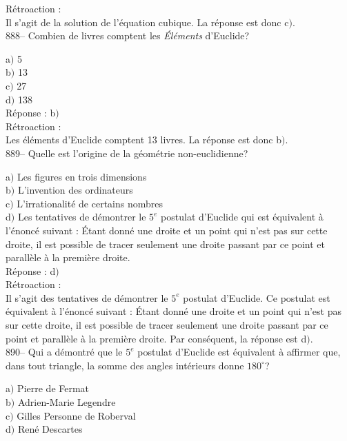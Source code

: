 ﻿\documentclass[letterpaper, 12pt]{article}
\begin{document}
R\'etroaction :\\
Il s'agit de la solution de l'\'equation cubique. La r\'eponse est donc
c$)$.\\

888-- Combien de livres comptent les {\sl \'El\'ements} d'Euclide?

a$)$ 5 \\
b$)$ 13  \\
c$)$ 27 \\
d$)$ 138 \\

R\'eponse : b$)$\\

R\'etroaction : \\
Les \'el\'ements d'Euclide comptent 13 livres. La r\'eponse est donc b$)$.\\

889-- Quelle est l'origine de la g\'eom\'etrie non-euclidienne?

a$)$ Les figures en trois dimensions \\
b$)$ L'invention des ordinateurs  \\
c$)$ L'irrationalit\'e de certains nombres \\
d$)$ Les tentatives de d\'emontrer le $5^e$ postulat d'Euclide qui
est \'equivalent \`a l'\'enonc\'e suivant : \og\'Etant donn\'e une
droite et un point qui n'est pas sur cette droite, il est possible
de tracer seulement une droite passant
par ce point et parall\`ele \`a la premi\`ere droite\fg .\\

R\'eponse : d$)$\\

R\'etroaction : \\
Il s'agit des tentatives de d\'emontrer le $5^e$ postulat d'Euclide.
Ce postulat est \'equivalent \`a l'\'enonc\'e suivant : \og\'Etant
donn\'e une droite et un point qui n'est pas sur cette droite, il
est possible de tracer seulement une droite passant par ce point et
parall\`ele \`a la premi\`ere droite\fg . Par cons\'equent, la
r\'eponse est d$)$.\\

890-- Qui a d\'emontr\'e que le $5^e$ postulat d'Euclide est
\'equivalent \`a affirmer que, dans tout triangle, la somme des
angles int\'erieurs donne $180^{\circ}$?

a$)$ Pierre de Fermat \\
b$)$ Adrien-Marie Legendre   \\
c$)$ Gilles Personne de Roberval \\
d$)$ Ren\'e Descartes \\
\end{document}
